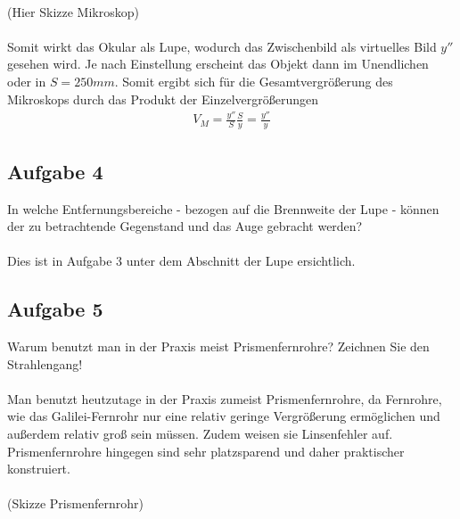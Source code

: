 \documentclass[a4paper,10pt]{scrartcl}
\begin{document}
			\\
			(Hier Skizze Mikroskop)\\
			\\
			Somit wirkt das Okular als Lupe, wodurch das Zwischenbild als virtuelles Bild \(y''\) gesehen wird. Je nach Einstellung erscheint das Objekt dann im Unendlichen oder in \(S=250mm\). Somit ergibt sich für die Gesamtvergrößerung des Mikroskops durch das Produkt der Einzelvergrößerungen
			\begin{align*}
			V_{M}=\frac{y''}{S}\frac{S}{y}=\frac{y''}{y}
			\end{align*}
			
			\newpage
			
		\subsection{Aufgabe 4}
			In welche Entfernungsbereiche - bezogen auf die Brennweite der Lupe - können der zu betrachtende
			Gegenstand und das Auge gebracht werden?\\
			\\
			Dies ist in Aufgabe 3 unter dem Abschnitt der Lupe ersichtlich.
			
		\subsection{Aufgabe 5}
			Warum benutzt man in der Praxis meist Prismenfernrohre? Zeichnen Sie den Strahlengang!\\
			\\
			Man benutzt heutzutage in der Praxis zumeist Prismenfernrohre, da Fernrohre, wie das Galilei-Fernrohr nur eine relativ geringe Vergrößerung ermöglichen und außerdem relativ groß sein müssen. Zudem weisen sie Linsenfehler auf. Prismenfernrohre hingegen sind sehr platzsparend und daher praktischer konstruiert.\\
			\\
			(Skizze Prismenfernrohr)\\
			\\
			
\end{document}
